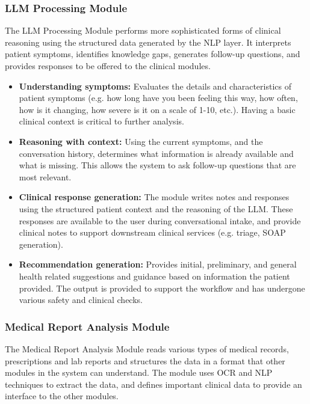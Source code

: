\documentclass[conference]{IEEEtran}
\begin{document}
\subsubsection{LLM Processing Module}

The LLM Processing Module performs more sophisticated forms of clinical reasoning using the structured data generated by the NLP layer. It interprets patient symptoms, identifies knowledge gaps, generates follow-up questions, and provides responses to be offered to the clinical modules.

\begin{itemize}

\item \textbf{Understanding symptoms:} Evaluates the details and characteristics of patient symptoms (e.g. how long have you been feeling this way, how often, how is it changing, how severe is it on a scale of 1-10, etc.). Having a basic clinical context is critical to further analysis.

\item \textbf{Reasoning with context:} Using the current symptoms, and the conversation history, determines what information is already available and what is missing. This allows the system to ask follow-up questions that are most relevant.

\item \textbf{Clinical response generation:} The module writes notes and responses using the structured patient context and the reasoning of the LLM. These responses are available to the user during conversational intake, and provide clinical notes to support downstream clinical services (e.g. triage, SOAP generation).

\item \textbf{Recommendation generation:} Provides initial, preliminary, and general health related suggestions and guidance based on information the patient provided. The output is provided to support the workflow and has undergone various safety and clinical checks.
\end{itemize}


\subsubsection{Medical Report Analysis Module}

The Medical Report Analysis Module reads various types of medical records, prescriptions and lab reports and structures the data in a format that other modules in the system can understand. The module uses OCR and NLP techniques to extract the data, and defines important clinical data to provide an interface to the other modules.
\end{document}
